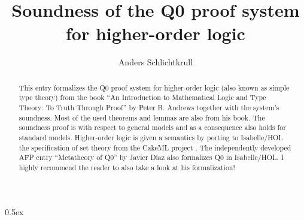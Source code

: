 \documentclass[10pt,a4paper]{article}
\begin{document}
\title{Soundness of the Q0 proof system for higher-order logic}
\author{Anders Schlichtkrull}
\date{}

\maketitle

\begin{abstract}
\noindent
This entry formalizes the Q0 proof system for higher-order logic (also known as simple type theory) from
the book ``An Introduction to Mathematical Logic and Type Theory: To Truth Through Proof'' 
by Peter B. Andrews \cite{andrews2013introduction} together with the system's soundness.
Most of the used theorems and lemmas are also from his book.
The soundness proof is with respect to general models and as a consequence also holds for standard models.
Higher-order logic is given a semantics by porting to Isabelle/HOL the
specification of set theory from the CakeML project \cite{DBLP:conf/itp/KumarAMO14,DBLP:journals/jar/KumarAMO16}.
The independently developed AFP entry ``Metatheory of Q0'' by Javier D{\'i}az \cite{Q0_Metatheory-AFP} also formalizes Q0 in Isabelle/HOL. 
I highly recommend the reader to also take a look at his formalization!
\end{abstract}

\tableofcontents

\newpage

\parindent 0pt
\parskip 0.5ex
\end{document}
